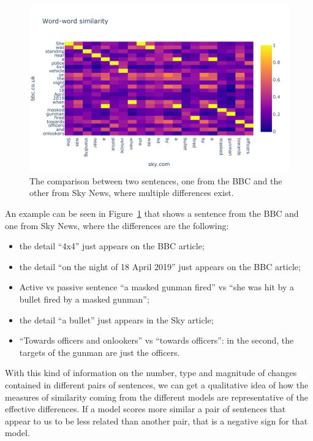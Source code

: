 \begin{figure}[!htb]
    \centering
    \includegraphics[width=\linewidth]{figures/lyra.pdf}
    \caption{The comparison between two sentences, one from the BBC and the other from Sky News, where multiple differences exist.}
    \label{fig:lyra}
\end{figure}

An example can be seen in Figure~\ref{fig:lyra} that shows a sentence from the BBC and one from Sky News, where the differences are the following:

\begin{itemize}
    \item the detail ``4x4'' just appears on the BBC article;
    \item the detail ``on the night of 18 April 2019'' just appears on the BBC article;
    \item Active vs passive sentence ``a masked gunman fired'' vs ``she was hit by a bullet fired by a masked gunman'';
    \item the detail ``a bullet'' just appears in the Sky article;
    \item ``Towards officers and onlookers'' vs ``towards officers'': in the second, the targets of the gunman are just the officers.
\end{itemize}

With this kind of information on the number, type and magnitude of changes contained in different pairs of sentences, we can get a qualitative idea of how the measures of similarity coming from the different models are representative of the effective differences. If a model scores more similar a pair of sentences that appear to us to be less related than another pair, that is a negative sign for that model. 


